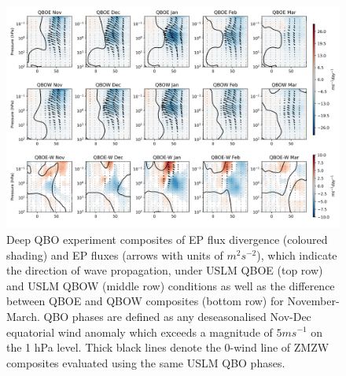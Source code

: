 \begin{figure}[h!]
\begin{center}
\noindent\includegraphics[width = \linewidth]{Figures/Figures-deepQBO/EP_flux_composites_by_month_QBO_phases_d_higher_anom_1hPa_5thresh.png}
\caption[EP flux composites under different USLM QBO phases in the deep QBO simulation]{Deep QBO experiment composites of EP flux divergence (coloured shading) and EP fluxes (arrows with units of $m^2s^{-2}$), which indicate the direction of wave propagation, under USLM QBOE (top row) and USLM QBOW (middle row) conditions as well as the difference between QBOE and QBOW composites (bottom row) for November-March. QBO phases are defined as any deseasonalised Nov-Dec equatorial wind anomaly which exceeds a magnitude of $5ms^{-1}$ on the 1 hPa level. Thick black lines denote the 0-wind line of ZMZW composites evaluated using the same USLM QBO phases.}
\label{fig:EP_deep_SAO}
\end{center}
\end{figure}

